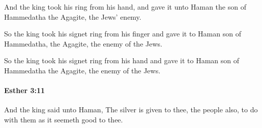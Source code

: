 			\begin{versebox}
					\item[BHS] 
					\item[LXX] 
					\item[ASV] And the king took his ring from his hand, and gave it unto Haman the son of Hammedatha the Agagite, the Jews' enemy.
					\item[NIV] So the king took his signet ring from his finger and gave it to Haman son of Hammedatha, the Agagite, the enemy of the Jews.
					\item[NRSV] So the king took his signet ring from his hand and gave it to Haman son of Hammedatha the Agagite, the enemy of the Jews.
			\end{versebox}

		\paragraph{Esther 3:11} %
			\label{ESTHER-3-11}

			And the king said unto Haman, The silver is given to thee, the people also, to do with them as it seemeth good to thee.

